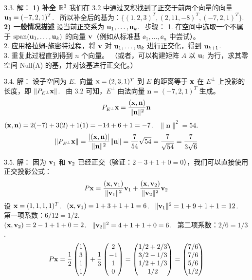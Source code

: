\begin{exer}
3.3. 解：
\textbf{1) 补全 $\mathbb{R}^3$}
我们在 3.2 中通过叉积找到了正交于前两个向量的向量 $\mathbf{u}_3 = (-7, 2, 1)^T$.~
所以补全后的基为：$\{(1, 2, 3)^T, (2, 11, -8)^T, (-7, 2, 1)^T\}$.~
\\
\textbf{2) 一般情况描述}
设当前正交系为 $\mathbf{u}_1, \dots, \mathbf{u}_k$.~
步骤：
1. 在空间中选取一个不属于 $\operatorname{span}(\mathbf{u}_1, \dots, \mathbf{u}_k)$ 的向量 $\mathbf{v}$（例如从标准基 $\ee_1, \dots, \ee_n$ 中尝试）。\\
2. 应用格拉姆-施密特过程，将 $\mathbf{v}$ 对 $\mathbf{u}_1, \dots, \mathbf{u}_k$ 进行正交化，得到 $\mathbf{u}_{k+1}$.~\\
3. 重复此过程直到得到 $n$ 个向量。
（或者，可以构建矩阵 $A$ 以 $\mathbf{u}_i$ 为行，求其零空间 Null(A) 的基，并对该基进行正交化。）

3.4. 解：
设子空间为 $E$.~向量 $\mathbf{x} = (2, 3, 1)^T$ 到 $E$ 的距离等于 $\mathbf{x}$ 在 $E^\perp$ 上投影的长度，即 $\| P_{E^\perp} \mathbf{x} \|$.~
由 3.2 可知，$E^\perp$ 由法向量 $\mathbf{n} = (-7, 2, 1)^T$ 生成。
$$ P_{E^\perp} \mathbf{x} = \frac{(\mathbf{x}, \mathbf{n})}{\|\mathbf{n}\|^2} \mathbf{n} $$
$(\mathbf{x}, \mathbf{n}) = 2(-7) + 3(2) + 1(1) = -14 + 6 + 1 = -7$.~
$\|\mathbf{n}\|^2 = 54$.~
$$ \| P_{E^\perp} \mathbf{x} \| = \frac{|(\mathbf{x}, \mathbf{n})|}{\|\mathbf{n}\|^2} \|\mathbf{n}\| = \frac{7}{54} \sqrt{54} = \frac{7}{\sqrt{54}} = \frac{7}{3\sqrt{6}} $$

3.5. 解：
因为 $\mathbf{v}_1$ 和 $\mathbf{v}_2$ 已经正交（验证：$2 - 3 + 1 + 0 = 0$），我们可以直接使用正交投影公式：
$$ P\mathbf{x} = \frac{(\mathbf{x}, \mathbf{v}_1)}{\|\mathbf{v}_1\|^2}\mathbf{v}_1 + \frac{(\mathbf{x}, \mathbf{v}_2)}{\|\mathbf{v}_2\|^2}\mathbf{v}_2 $$
设 $\mathbf{x} = (1, 1, 1, 1)^T$.~
$(\mathbf{x}, \mathbf{v}_1) = 1 + 3 + 1 + 1 = 6$.~
$\|\mathbf{v}_1\|^2 = 1 + 9 + 1 + 1 = 12$.~
第一项系数：$6/12 = 1/2$.~
\\
$(\mathbf{x}, \mathbf{v}_2) = 2 - 1 + 1 + 0 = 2$.~
$\|\mathbf{v}_2\|^2 = 4 + 1 + 1 + 0 = 6$.~
第二项系数：$2/6 = 1/3$.~
$$ P\mathbf{x} = \frac{1}{2} \begin{pmatrix} 1 \\ 3 \\ 1 \\ 1 \end{pmatrix} + \frac{1}{3} \begin{pmatrix} 2 \\ -1 \\ 1 \\ 0 \end{pmatrix} = \begin{pmatrix} 1/2 + 2/3 \\ 3/2 - 1/3 \\ 1/2 + 1/3 \\ 1/2 \end{pmatrix} = \begin{pmatrix} 7/6 \\ 7/6 \\ 5/6 \\ 1/2 \end{pmatrix} $$


\end{exer}
